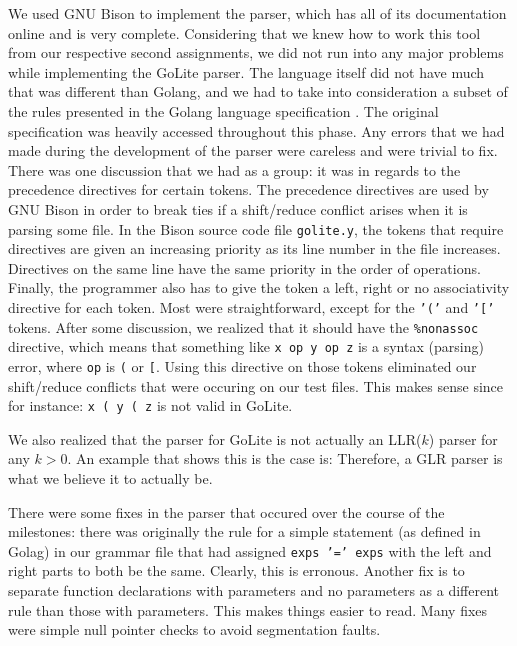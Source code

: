 \documentclass{article}
\begin{document}
We used GNU Bison to implement the parser, which has all of its documentation online and is very complete. Considering that we knew how to work this tool from our respective second assignments, we did not run into any major problems while implementing the GoLite parser. The language itself did not have much that was different than Golang, and we had to take into consideration a subset of the rules presented in the Golang language specification \cite{gospec}. The original specification was heavily accessed throughout this phase. Any errors that we had made during the development of the parser were careless and were trivial to fix. There was one discussion that we had as a group: it was in regards to the precedence directives for certain tokens. The precedence directives are used by GNU Bison in order to break ties if a shift/reduce conflict arises when it is parsing some file. In the Bison source code file \texttt{golite.y}, the tokens that require directives are given an increasing priority as its line number in the file increases. Directives on the same line have the same priority in the order of operations. Finally, the programmer also has to give the token a left, right or no associativity directive for each token. Most were straightforward, except for the \texttt{'('} and \texttt{'['} tokens. After some discussion, we realized that it should have the \verb|%nonassoc| directive, which means that something like \texttt{x op y op z} is a syntax (parsing) error, where \texttt{op} is \texttt{(} or \texttt{[}. Using this directive on those tokens eliminated our shift/reduce conflicts that were occuring on our test files. This makes sense since for instance: \texttt{x ( y ( z} is not valid in GoLite.

We also realized that the parser for GoLite is not actually an LLR($k$) parser for any $k>0$. An example that shows this is the case is:
Therefore, a GLR parser is what we believe it to actually be.

There were some fixes in the parser that occured over the course of the milestones: there was originally the rule for a simple statement (as defined in Golag) in our grammar file that had assigned \texttt{exps '=' exps} with the left and right parts to both be the same. Clearly, this is erronous. Another fix is to separate function declarations with parameters and no parameters as a different rule than those with parameters. This makes things easier to read. Many fixes were simple null pointer checks to avoid segmentation faults.
\end{document}
